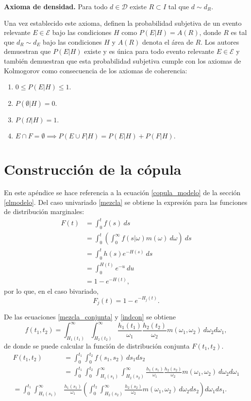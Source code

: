 \documentclass[11pt,a4paper]{article}
\begin{document}
\begin{appendices}
\textbf{Axioma de densidad.} Para todo $d \in \mathcal{D}$ existe $R \subset I$ tal que $d \sim d_R$.

Una vez establecido este axioma, \citet{mendoza} definen la probabilidad subjetiva de un evento relevante $E \in \mathcal{E}$ bajo las condiciones $H$ como $P(E|H) = A(R)$, donde $R$ es tal que $d_R \sim d_E$ bajo las condiciones $H$ y $A(R)$ denota el área de $R$. Los autores demuestran que $P(E|H)$ existe y es única para todo evento relevante $E \in \mathcal{E}$ y también demuestran que esta probabilidad subjetiva cumple con los axiomas de Kolmogorov como consecuencia de los axiomas de coherencia:
\begin{enumerate}
\item $0 \leq P(E|H) \leq 1$.
\item $P(\emptyset|H) = 0$.
\item $P(\Omega | H) = 1$.
\item $E\cap F = \emptyset \implies P(E\cup F|H) = P(E|H) + P(F|H)$.
\end{enumerate}

\newpage

\section{Construcción de la cópula} \label{construccion_copula}

En este apéndice se hace referencia a la ecuación \eqref{copula_modelo} de la sección \ref{elmodelo}. Del caso univariado \eqref{mezcla} se obtiene la expresión para las funciones de distribución marginales:
\begin{align*}
F(t) &= \int_0^t f(s) \ ds\\
&= \int_0^t\left(\int_0^\infty f(s|\omega)m(\omega) \ d\omega \right) \ ds\\
&= \int_0^t h(s)e^{-H(s)} \ ds\\
&= \int_0^{H(t)} e^{-u} \ du\\
&= 1-e^{-H(t)},
\end{align*}
por lo que, en el caso bivariado,
\begin{equation}\label{dist_marginal}
F_j(t) = 1-e^{-H_j(t)}.
\end{equation}

De las ecuaciones \eqref{mezcla_conjunta} y \eqref{indcon} se obtiene $$f(t_1, t_2) = \int_{H_1(t_1)}^\infty \int_{H_2(t_2)}^\infty \frac{h_1(t_1)}{\omega_1}\frac{h_2(t_2)}{\omega_2}m(\omega_1, \omega_2) \ d\omega_2 d\omega_1,$$ de donde se puede calcular la función de distribución conjunta $F(t_1, t_2)$.
\begin{align*}
F(t_1, t_2) &= \int_0^{t_1} \int_0^{t_2} f(s_1, s_2) \ ds_1 ds_2\\
&= \int_0^{t_1} \int_0^{t_2}\int_{H_1(s_1)}^\infty \int_{H_2(s_2)}^\infty \frac{h_1(s_1)}{\omega_1}\frac{h_2(s_2)}{\omega_2}m(\omega_1, \omega_2) \ d\omega_2 d\omega_1\\
= \int_0^{t_1}\int_{H_1(s_1)}^\infty &\frac{h_1(s_1)}{\omega_1}\left(\int_0^{t_2} \int_{H_2(s_2)}^\infty \frac{h_2(s_2)}{\omega_2} m(\omega_1, \omega_2) \ d\omega_2 ds_2 \right) d\omega_1 ds_1.
\end{align*}


\end{appendices}
\end{document}
